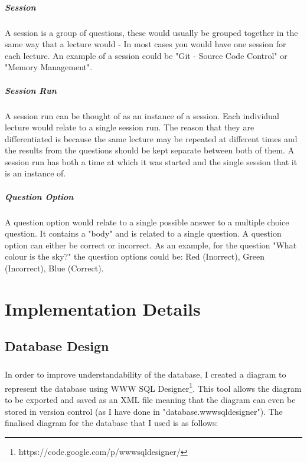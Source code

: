 \documentclass[10pt]{report}
\begin{document}
	\paragraph{Session}
	A session is a group of questions, these would usually be grouped together in the same way that a
	lecture would - In most cases you would have one session for each lecture.  An example of a session
	could be "Git - Source Code Control" or "Memory Management".
	
	\paragraph{Session Run}
	A session run can be thought of as an instance of a session.  Each individual lecture would relate to
	a single session run.  The reason that they are differentiated is because the same lecture may be
	repeated at different times and the results from the questions should be kept separate between both of
	them.  A session run has both a time at which it was started and the single session that it is an
	instance of.
	
	\paragraph{Question Option}
	A question option would relate to a single possible answer to a multiple choice question.  It contains
	a "body" and is related to a single question. A question option can either be correct or incorrect. As
	an example, for the question "What colour is the sky?" the question options could be: Red (Inorrect),
	Green (Incorrect), Blue (Correct).
	
	\chapter*{Implementation Details}
	\section*{Database Design}
	\paragraph{}
	In order to improve understandability of the database, I created a diagram to represent the database
	using WWW SQL Designer\footnote{https://code.google.com/p/wwwsqldesigner/}. This tool allows the
	diagram to be exported and saved as an XML file meaning that the diagram can even be stored in version
	control (as I have done in "database.wwwsqldesigner").  The finalised diagram for the database that
	I used is as follows:
	
\end{document}
